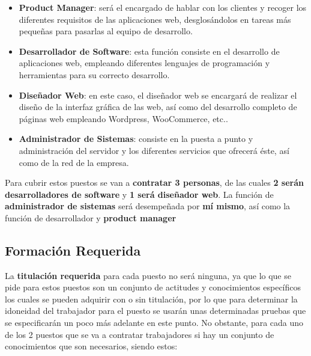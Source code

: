 \begin{itemize}
    \item \textbf{Product Manager}: será el encargado de hablar con los clientes y recoger los diferentes requisitos de las aplicaciones web, desglosándolos en tareas más pequeñas para pasarlas al equipo de desarrollo.

    \item \textbf{Desarrollador de Software}: esta función consiste en el desarrollo de aplicaciones web, empleando diferentes lenguajes de programación y herramientas para su correcto desarrollo.

    \item \textbf{Diseñador Web}: en este caso, el diseñador web se encargará de realizar el diseño de la interfaz gráfica de las web, así como del desarrollo completo de páginas web empleando Wordpress, WooCommerce, etc..

    \item \textbf{Administrador de Sistemas}: consiste en la puesta a punto y administración del servidor y los diferentes servicios que ofrecerá éste, así como de la red de la empresa.
\end{itemize}

Para cubrir estos puestos se van a \textbf{contratar 3 personas}, de las cuales \textbf{2 serán desarrolladores de software} y \textbf{1 será diseñador web}. La función de \textbf{administrador de sistemas} será desempeñada por \textbf{mí mismo}, así como la función de desarrollador y \textbf{product manager}


\subsection{Formación Requerida}
La \textbf{titulación requerida} para cada puesto no será ninguna, ya que lo que se pide para estos puestos son un conjunto de actitudes y conocimientos específicos los cuales se pueden adquirir con o sin titulación, por lo que para determinar la idoneidad del trabajador para el puesto se usarán unas determinadas pruebas que se especificarán un poco más adelante en este punto. No obstante, para cada uno de los 2 puestos que se va a contratar trabajadores si hay un conjunto de conocimientos que son necesarios, siendo estos:

